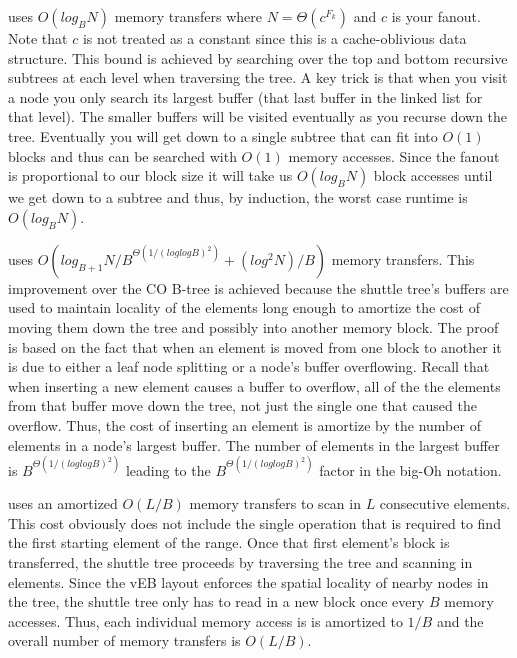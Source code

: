 \documentclass{style}
\begin{document}
\Search{} uses $O(log_B N)$ memory transfers where $N = \Theta(c^{F_k})$ and
$c$ is your fanout. Note that $c$ is not treated as a constant since this is a
cache-oblivious data structure. This bound is achieved by searching over the
top and bottom recursive subtrees at each level when traversing the tree. A
key trick is that when you visit a node you only search its largest buffer
(that last buffer in the linked list for that level). The smaller buffers will
be visited eventually as you recurse down the tree. Eventually you will get
down to a single subtree that can fit into $O(1)$ blocks and thus can be
searched with $O(1)$ memory accesses. Since the fanout is proportional to our
block size it will take us $O(log_B N)$ block accesses until we get down to a
subtree and thus, by induction, the worst case runtime is $O(log_B N)$.


\Insert{} uses $O(log_{B+1} N / B^{\Theta(1/(loglogB)^2)} + (log^2 N) / B)$
memory transfers. This improvement over the CO B-tree is achieved because the
shuttle tree's buffers are used to maintain locality of the elements long
enough to amortize the cost of moving them down the tree and possibly into
another memory block. The proof is based on the fact that when an element is
moved from one block to another it is due to either a leaf node splitting or a
node's buffer overflowing. Recall that when inserting a new element causes a
buffer to overflow, all of the the elements from that buffer move down the
tree, not just the single one that caused the overflow. Thus, the cost of
inserting an element is amortize by the number of elements in a node's largest
buffer. The number of elements in the largest buffer is
$B^{\Theta(1/(loglogB)^2)}$ leading to the $B^{\Theta(1/(loglogB)^2)}$ factor
in the big-Oh notation.

\Scan{} uses an amortized $O(L/B)$ memory transfers to scan in $L$ consecutive
elements. This cost obviously does not include the single \Search{} operation
that is required to find the first starting element of the range. Once that
first element's block is transferred, the shuttle tree proceeds by traversing
the tree and scanning in elements. Since the vEB layout enforces the spatial
locality of nearby nodes in the tree, the shuttle tree only has to read in a
new block once every $B$ memory accesses. Thus, each individual memory access
is is amortized to $1/B$ and the overall number of memory transfers is
$O(L/B)$.
\end{document}
